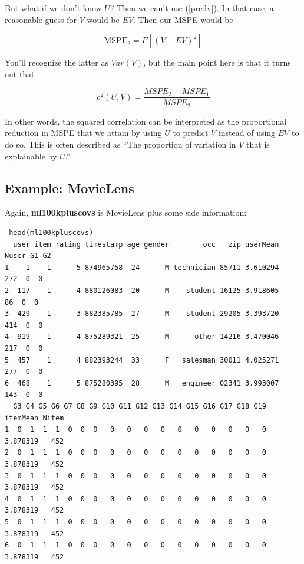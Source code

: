 But what if we don't know $U$?  Then we can't use (\ref{predv}).  In
that case, a reasonable guess for $V$ would be $EV$.  Then our MSPE
would be

\begin{equation}
\textrm{MSPE}_2 = E[(V - EV)^2]
\end{equation}

You'll recognize the latter as $Var(V)$, but the main point here is that
it turns out that

\begin{equation}
\rho^2(U,V) =
\frac{MSPE_2 - MSPE_1}{MSPE_2}
\end{equation}

In other words, the squared correlation can be interpreted as the
proportional reduction in MSPE that we attain by using $U$ to predict
$V$ instead of using $EV$ to do so.  This is often described as ``The
proportion of variation in $V$ that is explainable by $U$.''

\subsection{Example:  MovieLens}

Again, \textbf{ml100kpluscovs} is MovieLens plus some side information:

\begin{lstlisting}
 head(ml100kpluscovs)
  user item rating timestamp age gender        occ   zip userMean Nuser G1 G2
1    1    1      5 874965758  24      M technician 85711 3.610294   272  0  0
2  117    1      4 880126083  20      M    student 16125 3.918605    86  0  0
3  429    1      3 882385785  27      M    student 29205 3.393720   414  0  0
4  919    1      4 875289321  25      M      other 14216 3.470046   217  0  0
5  457    1      4 882393244  33      F   salesman 30011 4.025271   277  0  0
6  468    1      5 875280395  28      M   engineer 02341 3.993007   143  0  0
  G3 G4 G5 G6 G7 G8 G9 G10 G11 G12 G13 G14 G15 G16 G17 G18 G19 itemMean Nitem
1  0  1  1  1  0  0  0   0   0   0   0   0   0   0   0   0   0 3.878319   452
2  0  1  1  1  0  0  0   0   0   0   0   0   0   0   0   0   0 3.878319   452
3  0  1  1  1  0  0  0   0   0   0   0   0   0   0   0   0   0 3.878319   452
4  0  1  1  1  0  0  0   0   0   0   0   0   0   0   0   0   0 3.878319   452
5  0  1  1  1  0  0  0   0   0   0   0   0   0   0   0   0   0 3.878319   452
6  0  1  1  1  0  0  0   0   0   0   0   0   0   0   0   0   0 3.878319   452
\end{lstlisting}

